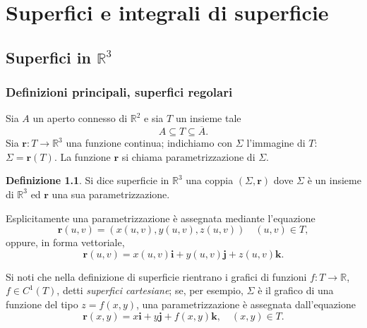 \documentclass[a4paper]{book}
\numberwithin{equation}{section}
\theoremstyle{plain}
\theoremstyle{definition}
\newtheorem{defn}{Definizione}[section]
\theoremstyle{remark}
\renewcommand{\vec}{\boldsymbol}
\theoremstyle{example}
\begin{document}
\chapter{Superfici e integrali di superficie}

\section{Superfici in $\mathbb{R}^3$}

\subsection{Definizioni principali, superfici regolari}

Sia $A$ un aperto connesso di $\mathbb{R}^2$ e sia $T$ un insieme tale
\begin{equation*}
A \subseteq T \subseteq \overline{A}.
\end{equation*}
Sia $\vec{r}\colon T \to \mathbb{R}^3$ una funzione continua; indichiamo con $\Sigma$ l'immagine di $T$: $\Sigma = \vec{r}(T)$. La funzione $\vec{r}$ si chiama parametrizzazione di $\Sigma$.
	\begin{defn}
		Si dice superficie in $\mathbb{R}^3$ una coppia $(\Sigma, \vec{r})$ dove $\Sigma$ è un insieme di $\mathbb{R}^3$ ed $\vec{r}$ una sua parametrizzazione.
	\end{defn}

	Esplicitamente una parametrizzazione è assegnata mediante l'equazione
		\begin{equation*}
			\vec{r}(u, v) = (x(u, v), y(u, v), z(u,v)) \quad (u, v) \in T,
		\end{equation*}
	oppure, in forma vettoriale,
		\begin{equation*}
			\vec{r}(u, v) = x(u,v)\vec{i}+y(u,v)\vec{j} + z(u,v)\vec{k}.
		\end{equation*}

	Si noti che nella definizione di superficie rientrano i grafici di funzioni $f \colon T \to \mathbb{R}$, $f \in C^1(T)$, detti \emph{superfici cartesiane}; se, per esempio, $\Sigma$ è il grafico di una funzione del tipo $z = f(x, y)$, una parametrizzazione è assegnata dall'equazione
		\begin{equation}
			\label{eqn:supcart}
			\vec{r}(x, y) = x\vec{i} + y\vec{j}+ f(x, y)\vec{k}, \quad (x, y) \in T.
		\end{equation}
\end{document}

